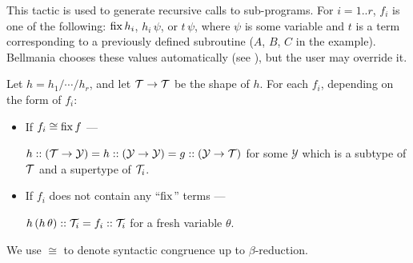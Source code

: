 This tactic is used to generate recursive calls to sub-programs. For $i=1..r$, $f_i$
is one of the following: $\operatorname{fix} h_i$, $h_i\,\psi$, or $t\,\psi$, where $\psi$ is some
variable and $t$ is a term corresponding to a previously defined subroutine
($A$, $B$, $C$ in the example).
Bellmania chooses these values automatically (see ),
but the user may override it.

\newcommand\Y{\mathcal{Y}}

\Obligations Let $h=h_1/\cdots/h_r$, and let $\mathcal{T}\to\mathcal{T}$ be the shape of $h$. 
  For each $f_i$, depending on the form of $f_i$:
\begin{itemize}
  \item If $f_i \cong \operatorname{fix} f$ --- \\
    \rule{0pt}{12pt}
    $h :: (\T \to \Y) = h :: (\Y \to \Y) = g :: (\Y \to \T)$
    for some $\Y$ which is a subtype of $\mathcal{T}$ and a supertype of $\mathcal{T}_i$.
  \item If $f_i$ does not contain any ``$\operatorname{fix}$'' terms ---\\
    \rule{0pt}{12pt}
    $h\,(h\,\theta) :: \mathcal{T}_i = f_i :: \mathcal{T}_i$ for a fresh variable $\theta$.
\end{itemize}

We use $\cong$ to denote syntactic congruence up to $\beta$-reduction.

\begin{comment}
\Obligations Let $h=h_1/\cdots/h_r$, let $\overline\theta\!=\!\theta_{1..r}$ be $r$ fresh variables, and let
$f = \theta_{1..r} \mapsto (f_1\,\theta_1)::\T_1/\cdots/(f_r\,\theta_r)::\T_r$.
\begin{itemize}
  \item $\T_{1..r}$ are disjoint mappings.
  \item {\bf Either}\quad $h\,(f\,\overline\theta) = f\,\overline\theta$ \\{\bf or}\qquad
  $\begin{array}[t]{l} h\,\theta=\theta ~\limplies~ (f_i\,\theta :: \T_i)=\theta :: \T_i ~, \\
  \theta::\T_1~/~\cdots~/~\theta::\T_r=\theta\end{array}$
\end{itemize}

(We give two alternatives, as the first is usually easier to prove, but may hold in less cases)
\end{comment}


\newenvironment{tacticbox}[1]{\begin{center}
  \begin{tabular}{|@{~~~~}l@{~~~~}|}\hline
    \rule{0pt}{2.3ex}\underline{\sf \,#1\,}\\[.4em]$}
  {$\\[-1em] \\[.3ex] \hline \end{tabular} \end{center}}


